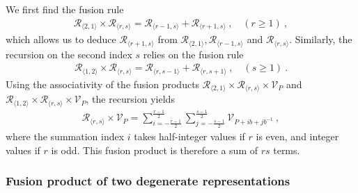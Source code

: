 \documentclass[12pt, a4paper, notitlepage, twoside]{report}
\numberwithin{equation}{section}
\theoremstyle{break}
\begin{document}
We first find the fusion rule 
\begin{align}
\mathcal{R}_{\langle 2,1\rangle}\times \mathcal{R}_{\langle r,s\rangle} = \mathcal{R}_{\langle r-1,s\rangle} + \mathcal{R}_{\langle r+1,s\rangle }\ , \quad (r\geq 1)\ ,
\label{rtod}
\end{align}
which allows us to deduce $\mathcal{R}_{\langle r+1,s\rangle}$ from $\mathcal{R}_{\langle 2,1\rangle}, \mathcal{R}_{\langle r-1,s\rangle}$ and $\mathcal{R}_{\langle r,s\rangle}$. Similarly, the recursion on the second index $s$ relies on the fusion rule 
\begin{align}
 \mathcal{R}_{\langle 1,2\rangle}\times \mathcal{R}_{\langle r,s\rangle} = \mathcal{R}_{\langle r,s-1\rangle} + \mathcal{R}_{\langle r,s+1\rangle }\ , \quad (s\geq 1)\ .
\end{align}
Using the associativity of the fusion products $\mathcal{R}_{\langle 2,1\rangle}\times \mathcal{R}_{\langle r,s\rangle}\times \mathcal{V}_P$ and $\mathcal{R}_{\langle 1,2\rangle}\times \mathcal{R}_{\langle r,s\rangle}\times \mathcal{V}_P$, the recursion yields
\begin{align}
 \boxed{\mathcal{R}_{\langle r,s \rangle}\times \mathcal{V}_P = \sum_{i=-\frac{r-1}{2}}^{\frac{r-1}{2}} \sum_{j=-\frac{s-1}{2}}^{\frac{s-1}{2}} \mathcal{V}_{P + ib+jb^{-1}}}
 \ ,
\label{rtv}
\end{align}
where the summation index $i$ takes half-integer values if $r$ is even, and integer values if $r$ is odd. 
This fusion product is therefore a sum of 
$rs$ terms.

\subsubsection{Fusion product of two degenerate representations}
\end{document}

